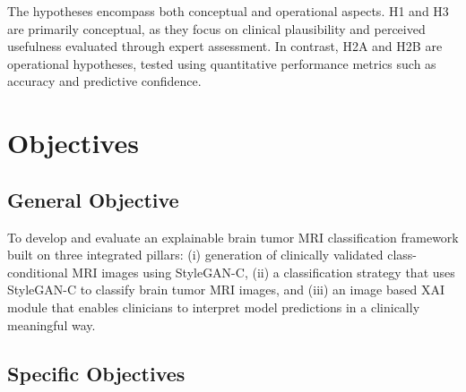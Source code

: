 The hypotheses encompass both conceptual and operational aspects. H1 and H3 are primarily conceptual, as they focus on clinical plausibility and perceived usefulness evaluated through expert assessment. In contrast, H2A and H2B are operational hypotheses, tested using quantitative performance metrics such as accuracy and predictive confidence.

\section{Objectives}

\subsection{General Objective}
To develop and evaluate an explainable brain tumor MRI classification framework built on three integrated pillars: (i) generation of clinically validated class-conditional MRI images using StyleGAN-C, (ii) a classification strategy that uses StyleGAN-C to classify brain tumor MRI images, and (iii) an image based XAI module that enables clinicians to interpret model predictions in a clinically meaningful way.


\subsection{Specific Objectives}

